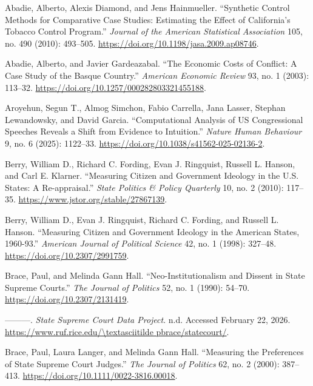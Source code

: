 \protect{}\label{refs}
\begin{CSLReferences}{1}{1}
Abadie, Alberto, Alexis Diamond, and Jens Hainmueller. {``Synthetic
{Control Methods} for {Comparative Case Studies}: {Estimating} the
{Effect} of {California}'s {Tobacco Control Program}.''} \emph{Journal
of the American Statistical Association} 105, no. 490 (2010): 493--505.
\url{https://doi.org/10.1198/jasa.2009.ap08746}.

Abadie, Alberto, and Javier Gardeazabal. {``The {Economic Costs} of
{Conflict}: {A Case Study} of the {Basque Country}.''} \emph{American
Economic Review} 93, no. 1 (2003): 113--32.
\url{https://doi.org/10.1257/000282803321455188}.

Aroyehun, Segun T., Almog Simchon, Fabio Carrella, Jana Lasser, Stephan
Lewandowsky, and David Garcia. {``Computational Analysis of {US}
Congressional Speeches Reveals a Shift from Evidence to Intuition.''}
\emph{Nature Human Behaviour} 9, no. 6 (2025): 1122--33.
\url{https://doi.org/10.1038/s41562-025-02136-2}.

Berry, William D., Richard C. Fording, Evan J. Ringquist, Russell L.
Hanson, and Carl E. Klarner. {``Measuring {Citizen} and {Government
Ideology} in the {U}.{S}. {States}: {A Re-appraisal}.''} \emph{State
Politics \& Policy Quarterly} 10, no. 2 (2010): 117--35.
\url{https://www.jstor.org/stable/27867139}.

Berry, William D., Evan J. Ringquist, Richard C. Fording, and Russell L.
Hanson. {``Measuring {Citizen} and {Government Ideology} in the
{American States}, 1960-93.''} \emph{American Journal of Political
Science} 42, no. 1 (1998): 327--48.
\url{https://doi.org/10.2307/2991759}.

Brace, Paul, and Melinda Gann Hall. {``Neo-{Institutionalism} and
{Dissent} in {State Supreme Courts}.''} \emph{The Journal of Politics}
52, no. 1 (1990): 54--70. \url{https://doi.org/10.2307/2131419}.

---------. \emph{State {Supreme Court Data Project}}. n.d. Accessed
February 22, 2026.
\href{https://www.ruf.rice.edu//textasciitilde\%20pbrace/statecourt/}{https://www.ruf.rice.edu/\textbackslash textasciitilde
pbrace/statecourt/}.

Brace, Paul, Laura Langer, and Melinda Gann Hall. {``Measuring the
{Preferences} of {State Supreme Court Judges}.''} \emph{The Journal of
Politics} 62, no. 2 (2000): 387--413.
\url{https://doi.org/10.1111/0022-3816.00018}.


\end{CSLReferences}
